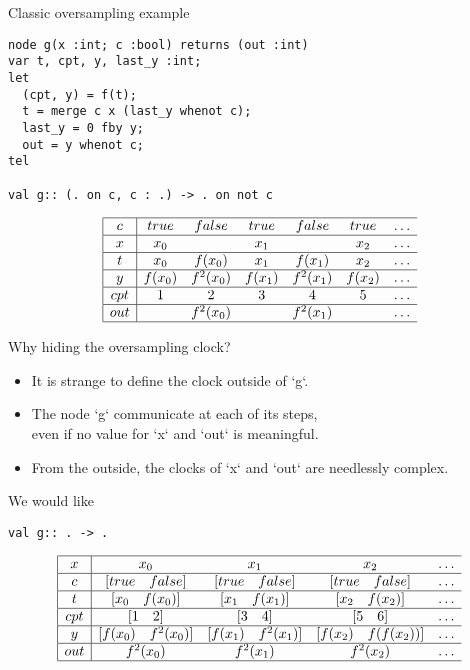 \documentclass[xcolor=dvipsnames]{beamer}
\def\li{\\ \hline}
\begin{document}
\begin{frame}[fragile]{Classic oversampling example}
\begin{lstlisting}
node g(x :int; c :bool) returns (out :int)
var t, cpt, y, last_y :int;
let
  (cpt, y) = f(t);
  t = merge c x (last_y whenot c);
  last_y = 0 fby y;
  out = y whenot c;
tel

val g:: (. on c, c : .) -> . on not c
\end{lstlisting}

\[
\begin{array}{|c|cccccccc} \hline
c & true & false & true & false & true & \ldots\li
x & x_0 & & x_1 & & x_2 &\ldots\li
t & x_0 & f(x_0) & x_1 & f(x_1) & x_2 &\ldots\li 
y & f(x_0) & f^2(x_0) & f(x_1) & f^2(x_1) & f(x_2) &\ldots\li
cpt & 1 & 2 & 3 & 4 & 5 &\ldots\li
out & & f^2(x_0) & & f^2(x_1) & &\ldots \li
\end{array}
\]
\end{frame}

\begin{frame}[fragile]{Why hiding the oversampling clock?}
\begin{block}{}
\begin{itemize}
  \item It is strange to define the clock outside of `g`.
  \item The node `g` communicate at each of its steps,\\
    even if no value for `x` and `out` is meaningful.
  \item From the outside, the clocks of `x` and `out` are needlessly complex.
\end{itemize}
\end{block}
\begin{block}{We would like}
\begin{lstlisting}
val g:: . -> .
\end{lstlisting}
\[
\begin{array}{|c|cccccccc} \hline
x & x_0 & x_1 & x_2 &\ldots\li
c & [true\quad false] & [true\quad false] & [true\quad false]& \ldots\li
t & [x_0\quad f(x_0)] & [x_1\quad f(x_1)] & [x_2\quad f(x_2)] &\ldots\li
cpt & [1 \quad 2] & [3 \quad 4] & [5 \quad 6] &\ldots\li
y & [f(x_0)\quad f^2(x_0)] & [f(x_1)\quad f^2(x_1)] & [f(x_2)\quad f(f(x_2))] &\ldots\li
out & f^2(x_0) & f^2(x_1) &f^2(x_2) &\ldots \li
\end{array}
\]
\end{block}
\end{frame}
\end{document}
